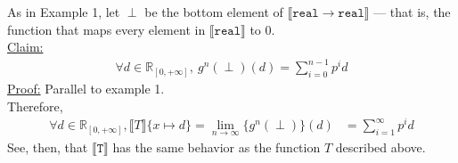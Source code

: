 \documentclass{westhesis}
\theoremstyle{plain}
\theoremstyle{definition}
\newcommand{\R}{\mathbb{R}}
\begin{document}
As in Example 1, let $\perp$ be the bottom element of $\llbracket \texttt{real} \rightarrow \texttt{real} \rrbracket$ --- that is, 
the function that maps every element in $\llbracket \texttt{real} \rrbracket$ to $0$. \\
 \underline{Claim:}
 \begin{align*}
 \forall d \in \R_{[0, +\infty]}, \ g^n(\perp)(d) = \sum_{i = 0}^{n-1}p^{i}d
 \end{align*}
 \underline{Proof:} Parallel to example 1. \\
Therefore, 
 \begin{align*}
 \forall d \in \R_{[0,+\infty]}, \llbracket T \rrbracket\{x \mapsto d \} =  \lim_{n \to \infty}\{g^n (\perp)\}(d) &= \sum_{i=1}^{\infty} 
 p^{i}d 
 \end{align*}
 See, then, that $\llbracket \texttt{T} \rrbracket$ has the same behavior as the function $T$ described above.
\end{document}
